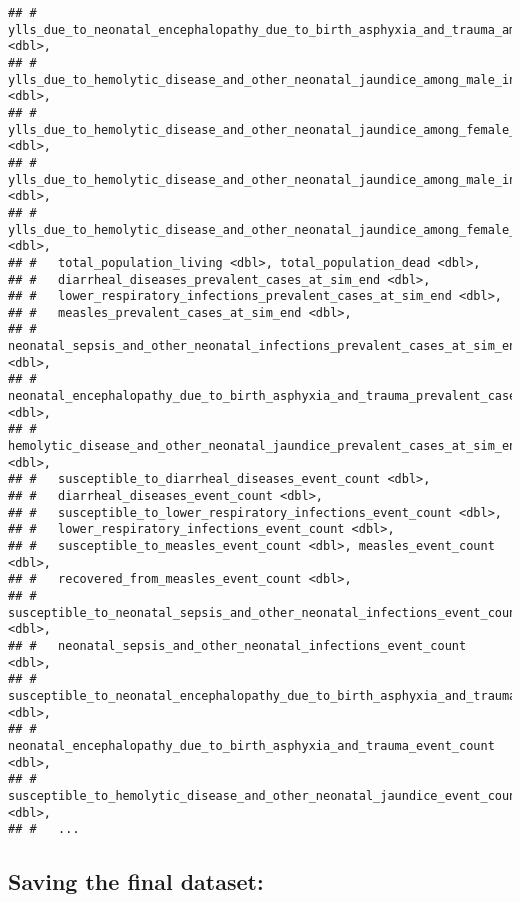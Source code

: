 \documentclass[]{article}
\begin{document}
\begin{verbatim}
## #   ylls_due_to_neonatal_encephalopathy_due_to_birth_asphyxia_and_trauma_among_female_in_age_group_1_to_4 <dbl>,
## #   ylls_due_to_hemolytic_disease_and_other_neonatal_jaundice_among_male_in_age_group_late_neonatal <dbl>,
## #   ylls_due_to_hemolytic_disease_and_other_neonatal_jaundice_among_female_in_age_group_late_neonatal <dbl>,
## #   ylls_due_to_hemolytic_disease_and_other_neonatal_jaundice_among_male_in_age_group_1_to_4 <dbl>,
## #   ylls_due_to_hemolytic_disease_and_other_neonatal_jaundice_among_female_in_age_group_1_to_4 <dbl>,
## #   total_population_living <dbl>, total_population_dead <dbl>,
## #   diarrheal_diseases_prevalent_cases_at_sim_end <dbl>,
## #   lower_respiratory_infections_prevalent_cases_at_sim_end <dbl>,
## #   measles_prevalent_cases_at_sim_end <dbl>,
## #   neonatal_sepsis_and_other_neonatal_infections_prevalent_cases_at_sim_end <dbl>,
## #   neonatal_encephalopathy_due_to_birth_asphyxia_and_trauma_prevalent_cases_at_sim_end <dbl>,
## #   hemolytic_disease_and_other_neonatal_jaundice_prevalent_cases_at_sim_end <dbl>,
## #   susceptible_to_diarrheal_diseases_event_count <dbl>,
## #   diarrheal_diseases_event_count <dbl>,
## #   susceptible_to_lower_respiratory_infections_event_count <dbl>,
## #   lower_respiratory_infections_event_count <dbl>,
## #   susceptible_to_measles_event_count <dbl>, measles_event_count <dbl>,
## #   recovered_from_measles_event_count <dbl>,
## #   susceptible_to_neonatal_sepsis_and_other_neonatal_infections_event_count <dbl>,
## #   neonatal_sepsis_and_other_neonatal_infections_event_count <dbl>,
## #   susceptible_to_neonatal_encephalopathy_due_to_birth_asphyxia_and_trauma_event_count <dbl>,
## #   neonatal_encephalopathy_due_to_birth_asphyxia_and_trauma_event_count <dbl>,
## #   susceptible_to_hemolytic_disease_and_other_neonatal_jaundice_event_count <dbl>,
## #   ...
\end{verbatim}

\hypertarget{saving-the-final-dataset}{%
\subsection{Saving the final dataset:}\label{saving-the-final-dataset}}
\end{document}
